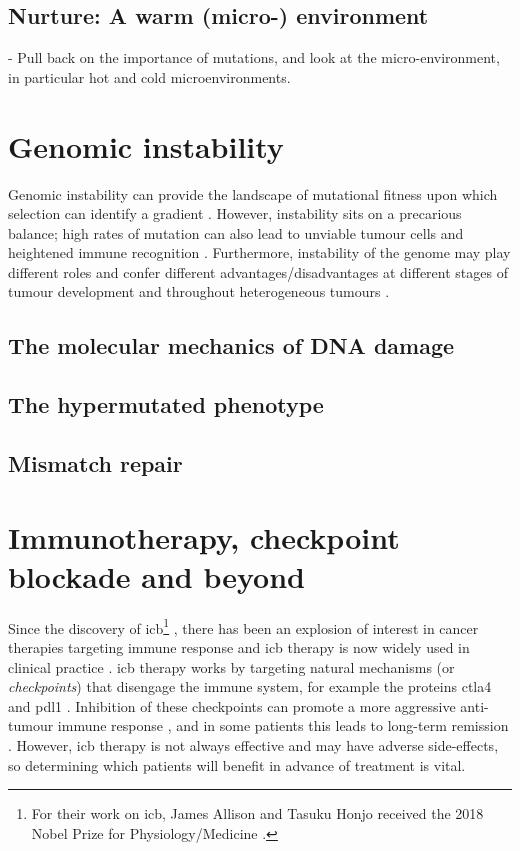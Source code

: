 \documentclass[../thesis.tex]{subfiles}
\begin{document}
\subsection{Nurture: A warm (micro-) environment}
- Pull back on the importance of mutations, and look at the micro-environment, in particular hot and cold microenvironments. \citep{keenan_genomic_2019} \citep{boulter_fibrotic_2020}



\section{Genomic instability}
Genomic instability can provide the landscape of mutational fitness upon which selection can identify a gradient \citep{hanahan_hallmarks_2011}. However, instability sits on a precarious balance; high rates of mutation can also lead to unviable tumour cells and heightened immune recognition \citep{aguade-gorgorio_genetic_2019}. Furthermore, instability of the genome may play different roles and confer different advantages/disadvantages at different stages of tumour development and throughout heterogeneous tumours \citep{asatryan_evolution_2016}.
\subsection{The molecular mechanics of DNA damage}
\subsection{The hypermutated phenotype}
\subsection{Mismatch repair}
\section{Immunotherapy, checkpoint blockade and beyond}
Since the discovery of \gls{icb}\footnote{For their work on \gls{icb}, James Allison and Tasuku Honjo received the 2018 Nobel Prize for Physiology/Medicine \citep{ledford_cancer_2018}.}  \citep{ishida_induced_1992,leach_enhancement_1996},  there has been an explosion of interest in cancer therapies targeting immune response and \gls{icb} therapy is now widely used in clinical practice \citep{robert_decade_2020}.  \gls{icb} therapy works by targeting natural mechanisms (or \emph{checkpoints}) that disengage the immune system, for example the proteins \gls{ctla4} and \gls{pdl1} \citep{buchbinder_ctla-4_2016}. Inhibition of these checkpoints can promote a more aggressive anti-tumour immune response \citep{pardoll_blockade_2012}, and in some patients this leads to long-term remission \citep{borghaei_five-year_2021}. However, \gls{icb} therapy is not always effective \citep{nowicki_mechanisms_2018} and may have adverse side-effects, so determining which patients will benefit in advance of treatment is vital. 
\end{document}
